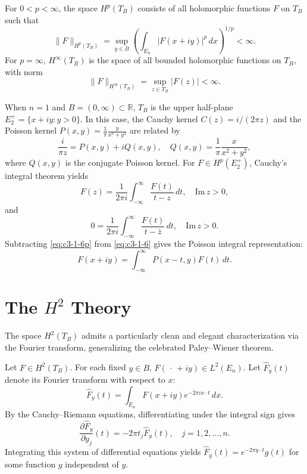 For $0 < p < \infty$, the space $H^p(T_B)$ consists of all holomorphic functions $F$ on $T_B$ such that
\begin{equation}\label{eq:c3-1-4}
\|F\|_{H^p(T_B)} = \sup_{y \in B} \left( \int_{E_n} |F(x + iy)|^p\,dx \right)^{1/p} < \infty.
\end{equation}
For $p = \infty$, $H^\infty(T_B)$ is the space of all bounded holomorphic functions on $T_B$, with norm
\begin{equation}\tag{1.4$'$}\label{eq:c3-1-4p}
\|F\|_{H^\infty(T_B)} = \sup_{z \in T_B} |F(z)| < \infty.
\end{equation}

When $n = 1$ and $B = (0, \infty) \subset \mathbb{R}$, $T_B$ is the upper half-plane $E_2^+ = \{x + iy : y > 0\}$. In this case, the Cauchy kernel $C(z) = i/(2\pi z)$ and the Poisson kernel $P(x, y) = \frac{1}{\pi} \frac{y}{x^2 + y^2}$ are related by
\begin{equation}\label{eq:c3-1-5}
\frac{i}{\pi z} = P(x, y) + i Q(x, y), \quad Q(x, y) = \frac{1}{\pi} \frac{x}{x^2 + y^2},
\end{equation}
where $Q(x, y)$ is the conjugate Poisson kernel. For $F \in H^p(E_2^+)$, Cauchy's integral theorem yields
\begin{equation}\label{eq:c3-1-6}
F(z) = \frac{1}{2\pi i} \int_{-\infty}^\infty \frac{F(t)}{t - z}\,dt, \quad \text{Im}\,z > 0,
\end{equation}
and
\begin{equation}\tag{1.6$'$}\label{eq:c3-1-6p}
0 = \frac{1}{2\pi i} \int_{-\infty}^\infty \frac{F(t)}{t - \bar{z}}\,dt, \quad \text{Im}\,z > 0.
\end{equation}
Subtracting \eqref{eq:c3-1-6p} from \eqref{eq:c3-1-6} gives the Poisson integral representation:
\begin{equation}\label{eq:c3-1-7}
F(x + iy) = \int_{-\infty}^\infty P(x - t, y) F(t)\,dt.
\end{equation}

\section{The \texorpdfstring{$H^2$}{H2} Theory}

The space $H^2(T_B)$ admits a particularly clean and elegant characterization via the Fourier transform, generalizing the celebrated Paley--Wiener theorem.

Let $F \in H^2(T_B)$. For each fixed $y \in B$, $F(\,\cdot\, + iy) \in L^2(E_n)$. Let $\hat{F}_y(t)$ denote its Fourier transform with respect to $x$:
\begin{equation}\label{eq:c3-2-1}
\hat{F}_y(t) = \int_{E_n} F(x + iy) e^{-2\pi i x \cdot t}\,dx.
\end{equation}
By the Cauchy--Riemann equations, differentiating under the integral sign gives
\begin{equation}\label{eq:c3-2-2}
\frac{\partial \hat{F}_y}{\partial y_j}(t) = -2\pi t_j \hat{F}_y(t), \quad j = 1, 2, \dots, n.
\end{equation}
Integrating this system of differential equations yields $\hat{F}_y(t) = e^{-2\pi y \cdot t} g(t)$ for some function $g$ independent of $y$.

